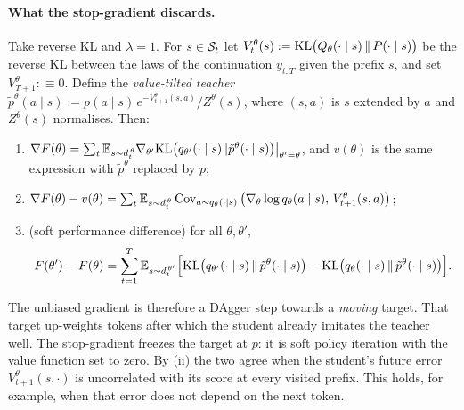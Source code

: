 \paragraph{What the stop-gradient discards.}

\begin{proposition}\label{prop:tilt}
\Pv\Ck Take reverse KL and $\lambda=1$. For $s\in\mathcal{S}_t$ let $V^\theta_t(s):=\mathrm{KL}\big(Q_\theta(\cdot\mid s)\,\|\,P(\cdot\mid s)\big)$ be the reverse KL
between the laws of the continuation $y_{t:T}$ given the prefix $s$, and set $V^\theta_{T+1}:\equiv0$. Define the
\emph{value-tilted teacher} $\tilde p^\theta(a\mid s):=p(a\mid s)\,e^{-V^\theta_{t+1}(s,a)}/Z^\theta(s)$, where $(s,a)$ is $s$ extended by $a$ and
$Z^\theta(s)$ normalises. Then:
\begin{enumerate}[label=(\roman*),nosep]
\item $\nabla F(\theta)=\sum_t\mathbb{E}_{s\sim d^{\,\theta}_{t}}\nabla_{\theta'}\mathrm{KL}\big(q_{\theta'}(\cdot\mid s)\|\tilde p^\theta(\cdot\mid s)\big)\big|_{\theta'=\theta}$, and $v(\theta)$ is the same expression
with $\tilde p^\theta$ replaced by $p$;
\item $\nabla F(\theta)-v(\theta)=\sum_t\mathbb{E}_{s\sim d^{\,\theta}_{t}}\operatorname{Cov}_{a\sim q_\theta(\cdot\mid s)}\big(\nabla_\theta\log q_\theta(a\mid s),\,V^\theta_{t+1}(s,a)\big)$;
\item (soft performance difference) for all $\theta,\theta'$,
\[
F(\theta')-F(\theta)=\sum_{t=1}^T\mathbb{E}_{s\sim d^{\,\theta'}_t}\Big[\mathrm{KL}\big(q_{\theta'}(\cdot\mid s)\,\|\,\tilde p^\theta(\cdot\mid s)\big)-\mathrm{KL}\big(q_\theta(\cdot\mid s)\,\|\,\tilde p^\theta(\cdot\mid s)\big)\Big].
\]
\end{enumerate}
\end{proposition}
\noindent
The unbiased gradient is therefore a DAgger step towards a \emph{moving} target. That target up-weights tokens after
which the student already imitates the teacher well. The stop-gradient freezes the target at $p$: it is soft policy
iteration with the value function set to zero. By (ii) the two agree when the student's future error $V^\theta_{t+1}(s,\cdot)$
is uncorrelated with its score at every visited prefix. This holds, for example, when that error does not depend on the next token.
